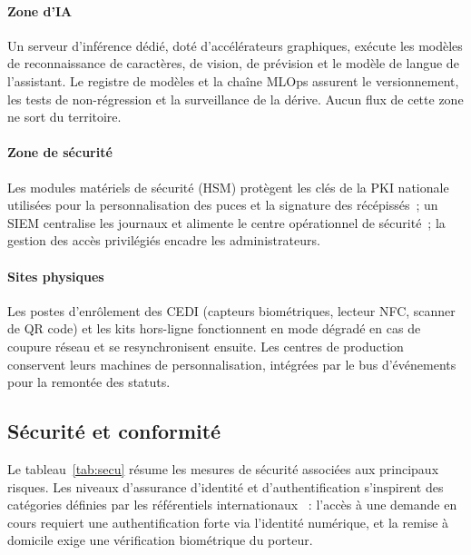 \paragraph{Zone d'IA} Un serveur d'inférence dédié, doté d'accélérateurs graphiques, exécute les modèles de reconnaissance de caractères, de vision, de prévision et le modèle de langue de l'assistant. Le registre de modèles et la chaîne MLOps assurent le versionnement, les tests de non-régression et la surveillance de la dérive. Aucun flux de cette zone ne sort du territoire.
\paragraph{Zone de sécurité} Les modules matériels de sécurité (HSM) protègent les clés de la PKI nationale utilisées pour la personnalisation des puces et la signature des récépissés~; un SIEM centralise les journaux et alimente le centre opérationnel de sécurité~; la gestion des accès privilégiés encadre les administrateurs.
\paragraph{Sites physiques} Les postes d'enrôlement des CEDI (capteurs biométriques, lecteur NFC, scanner de QR code) et les kits hors-ligne fonctionnent en mode dégradé en cas de coupure réseau et se resynchronisent ensuite. Les centres de production conservent leurs machines de personnalisation, intégrées par le bus d'événements pour la remontée des statuts.

\subsection{Sécurité et conformité}
Le tableau~\ref{tab:secu} résume les mesures de sécurité associées aux principaux risques. Les niveaux d'assurance d'identité et d'authentification s'inspirent des catégories définies par les référentiels internationaux \cite{nist80063}~: l'accès à une demande en cours requiert une authentification forte via l'identité numérique, et la remise à domicile exige une vérification biométrique du porteur.

